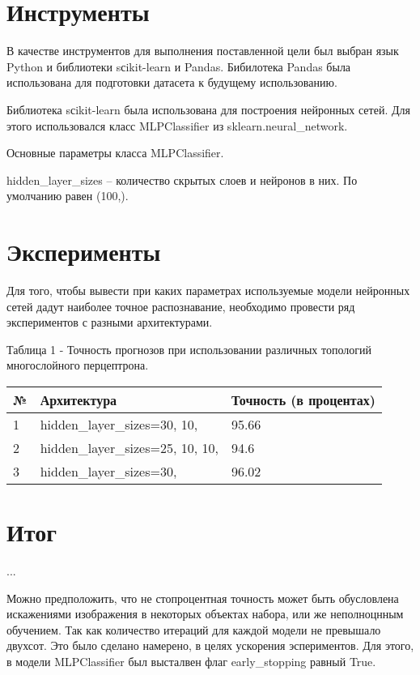 \documentclass[a4paper,12pt]{article}
\begin{document}
	
\newpage\section{Инструменты} 
	В качестве инструментов для выполнения поставленной цели был выбран язык Python и библиотеки sсikit-learn и Pandas.
	Бибилотека Pandas была использована для подготовки датасета к будущему использованию.
	
	\vspace{0.5cm}
	Библиотека sсikit-learn была использована для построения нейронных сетей. Для этого использовался класс MLPClassifier из sklearn.neural\_network.
	
	\vspace{0.5cm}
	Основные параметры класса MLPClassifier.
	
	\vspace{0.5cm}
	hidden\_layer\_sizes – количество скрытых слоев и нейронов в них. По умолчанию равен (100,).

	
\newpage\section{Эксперименты}
	Для того, чтобы вывести при каких параметрах используемые модели нейронных сетей дадут наиболее точное распознавание, необходимо провести ряд экспериментов с разными архитектурами. 

	\vspace{0.5cm}
	Таблица 1 - Точность прогнозов  при использовании различных топологий многослойного перцептрона.
\begin{longtable}{|p{1cm}|p{9cm}|p{3cm}|}
\hline
№ & Архитектура & Точность (в процентах) \\ 
\hline 
1 & hidden\_layer\_sizes=30, 10, & 95.66 \\
\hline
2 & hidden\_layer\_sizes=25, 10, 10,  & 94.6 \\
\hline 
3 & hidden\_layer\_sizes=30, & 96.02 \\
\hline
\end{longtable}


\newpage\section{Итог}
	...
	
	\vspace{0.5cm}
	Можно предположить, что не стопроцентная точность может быть обусловлена искажениями изображения в некоторых объектах  набора, или же неполноцнным обучением. Так как количество итераций для каждой модели не превышало двухсот. Это было сделано намерено, в целях ускорения эспериментов. Для этого, в модели MLPClassifier был высталвен флаг early\_stopping равный True.
	
	
\end{document}
